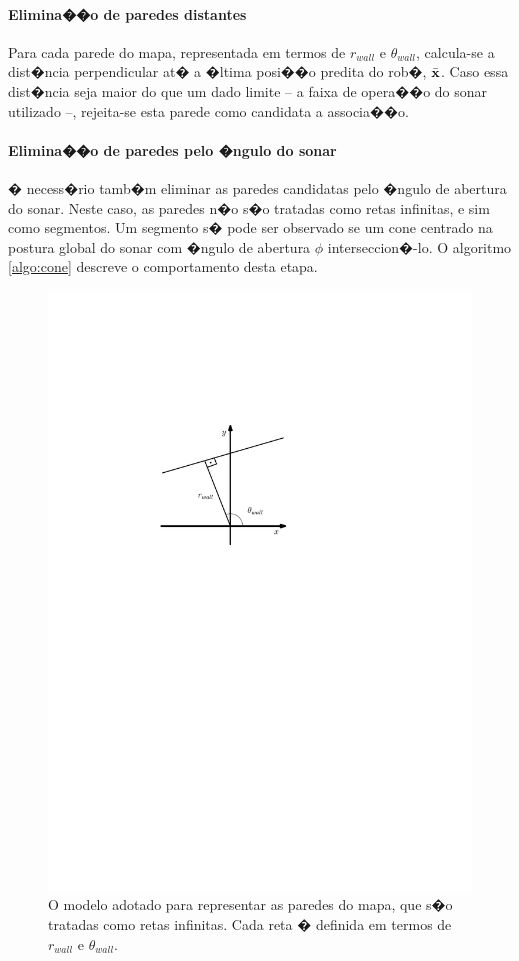 \paragraph{Elimina��o de paredes distantes}

Para cada parede do mapa, representada em termos de $r_{wall}$ e $\theta_{wall}$, calcula-se a dist�ncia perpendicular at� a �ltima posi��o predita do rob�, $\bar{\bf{{x}}}$. Caso essa dist�ncia seja maior do que um dado limite -- a faixa de opera��o do sonar utilizado --, rejeita-se esta parede como candidata a associa��o.

\paragraph{Elimina��o de paredes pelo �ngulo do sonar}

� necess�rio tamb�m eliminar as paredes candidatas pelo �ngulo de abertura do sonar. Neste caso, as paredes n�o s�o tratadas como retas infinitas, e sim como segmentos. Um segmento s� pode ser observado se um cone centrado na postura global do sonar com �ngulo de abertura $\phi$ interseccion�-lo. O algoritmo \ref{algo:cone} descreve o comportamento desta etapa.

\begin{figure}[hbt]
	\centering
	\includegraphics[width=.5\columnwidth]{imagens/retas.pdf}
	\caption{O modelo adotado para representar as paredes do mapa, que s�o tratadas como retas infinitas. Cada reta � definida em termos de $r_{wall}$ e $\theta_{wall}$.}
	\label{fig:retas}
\end{figure}

